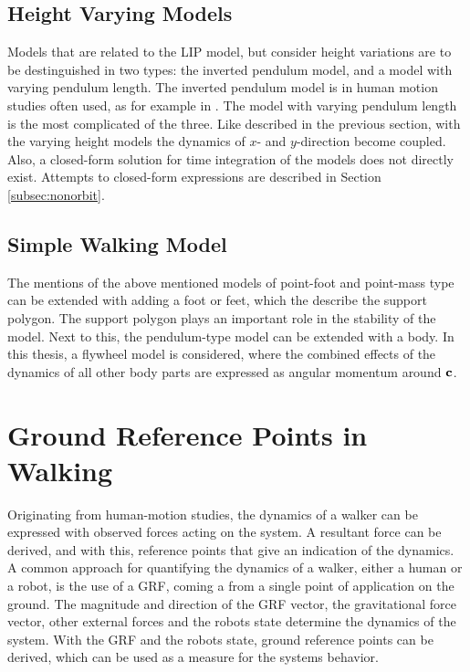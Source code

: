 \subsection{Height Varying Models}
Models that are related to the \ac{LIP} model, but consider height variations are to be destinguished in two types: the inverted pendulum model, and a model with varying pendulum length. The inverted pendulum model is in human motion studies often used, as for example in \cite{kuo2005energetic}. The model with varying pendulum length is the most complicated of the three. Like described in the previous section, with the varying height models the dynamics of $x$- and $y$-direction become coupled. Also, a closed-form solution for time integration of the models does not directly exist. Attempts to closed-form expressions are described in Section \ref{subsec:nonorbit}.

\subsection{Simple Walking Model}
The mentions of the above mentioned models of point-foot and point-mass type can be extended with adding a foot or feet, which the describe the support polygon. The support polygon plays an important role in the stability of the model. Next to this, the pendulum-type model can be extended with a body. In this thesis, a flywheel model is considered, where the combined effects of the dynamics of all other body parts are expressed as angular momentum around $\mathbf{c}$.


\section{Ground Reference Points in Walking}
Originating from human-motion studies, the dynamics of a walker can be expressed with observed forces acting on the system. A resultant force can be derived, and with this, reference points that give an indication of the dynamics.\\
A common approach for quantifying the dynamics of a walker, either a human or a robot, is the use of a \ac{GRF}, coming a from a single point of application on the ground. The magnitude and direction of the \ac{GRF} vector, the gravitational force vector, other external forces and the robots state determine the dynamics of the system. With the \ac{GRF} and the robots state, ground reference points can be derived, which can be used as a measure for the systems behavior.

